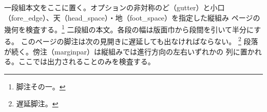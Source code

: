 \documentclass[pdflatex,tate,paper=b5,twoside,twocolumn,
  gutter=15zw,fore_edge=8zw,head_space=10zw,foot_space=6zw]{jlreq}
\begin{document}
%

一段組本文をここに置く。オプションの非対称のど（gutter）と小口
（fore\string_edge）、天（head\string_space）・地（foot\string_space）を指定した縦組み
ページの幾何を検査する。\footnote{脚注その一。}
\clearpage
\twocolumn
二段組の本文。各段の幅は版面巾から段間を引いて半分にする。
このページの脚注は次の見開きに遅延しても出なければならない。
\footnote{遅延脚注。}
%
段落が続く。傍注（marginpar）は縦組みでは進行方向の左右いずれかの
列に置かれる。ここでは出力されることのみを検査する。
%
\clearpage
%
\ifdim\textwidth<100pt
  \typeout{FURN-FAIL: textwidth clobbered}%
\else
  \typeout{FURN-PASS: textwidth intact (\the\textwidth)}%
\fi
\ifdim\columnwidth<50pt
  \typeout{TWOCOL-FAIL: columnwidth clobbered}%
\else
  \typeout{TWOCOL-PASS: columnwidth intact (\the\columnwidth)}%
\fi
{}%
\end{document}
